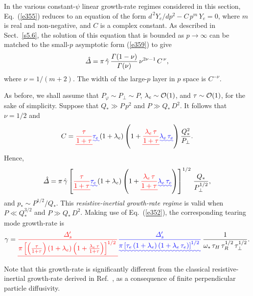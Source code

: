 \documentclass[12pt,prb,aps]{revtex4-1}
\providecommand{\DIFadd}[1]{{\protect\color{blue}\uwave{#1}}} %
\providecommand{\DIFdel}[1]{{\protect\color{red}\sout{#1}}}                      %
\providecommand{\DIFaddbegin}{} %
\providecommand{\DIFaddend}{} %
\providecommand{\DIFdelbegin}{} %
\providecommand{\DIFdelend}{} %
\begin{document}
In the various constant-$\psi$ linear growth-rate regimes considered in this section, Eq.~(\ref{e355}) reduces to an equation of the form
$d^{\,2} Y_e/dp^2 - C\,p^m\,Y_e = 0$,
where $m$ is real and non-negative, and $C$ is a complex constant. As described in Sect.~\ref{s5.6}, the solution of this
equation that is bounded as $p\rightarrow \infty$ can be matched to the small-$p$ asymptotic form (\ref{e359}) to give 
\begin{equation}
\hat{\mit\Delta} = \pi\,\hat{\gamma}\,\frac{{\mit\Gamma}(1-\nu)}{{\mit\Gamma}(\nu)}\,\nu^{2\nu-1}\,C^{\,\nu},
\end{equation}
where $\nu=1/(m+2)$. The width of the large-$p$ layer in $p$ space is $C^{-\nu}$. 

As before, we shall assume that $P_\varphi\sim P_\perp \sim P$, $\lambda_e\sim{\cal O}(1)$, and $\tau\sim {\cal O}(1)$, for
the sake of simplicity. 
Suppose that $Q_\ast\gg P\,p^2$ and $P\gg Q_\ast\,D^2$. It follows that $\nu=1/2$ and
\begin{equation}
C =\DIFdelbegin %
\DIFdel{\frac{\tau}{1+\tau}}%
\DIFdelend \DIFaddbegin \DIFadd{\tau_e\, }\DIFaddend (1+\lambda_e)\left(1+\DIFdelbegin \DIFdel{\frac{\lambda_e\,\tau}{1+\tau}}\DIFdelend \DIFaddbegin \DIFadd{\lambda_e\,\tau_e}\DIFaddend \right)\frac{Q_\ast^{2}}{P_\perp}.
\end{equation}
Hence, 
\begin{equation}
\hat{\mit\Delta} = \pi\,\hat{\gamma}\left[ \DIFdelbegin %
\DIFdel{\frac{\tau}{1+\tau}}%
\DIFdelend \DIFaddbegin \DIFadd{\tau_e\,}\DIFaddend (1+\lambda_e)\left(1+\DIFdelbegin \DIFdel{\frac{\lambda_e\,\tau}{1+\tau}}\DIFdelend \DIFaddbegin \DIFadd{\lambda_e\,\tau_e}\DIFaddend \right)\right]^{1/2}\,\frac{Q_\ast}{P_\perp^{1/2}},
\end{equation}
and $p_\ast\sim P^{1/2}/Q_\ast$. This {\em resistive-inertial  growth-rate regime}\/ is valid when $P\ll Q_\ast^{3/2}$ and
$P\gg Q_\ast\,D^2$. 
Making use of Eq.~(\ref{e352}), the corresponding tearing mode growth-rate is
\begin{equation}\label{e363}
\gamma = \DIFdelbegin \DIFdel{\frac{{\mit\Delta}_s'}{\pi\left[ \left(\frac{\tau}{1+\tau}\right)(1+\lambda_e)\left(1+\frac{\lambda_e\,\tau}{1+\tau}\right)\right]^{1/2}\,}}\DIFdelend \DIFaddbegin \DIFadd{\frac{{\mit\Delta}_s'}{\pi\left[ \tau_e\,(1+\lambda_e)\left(1+\lambda_e\,\tau_e\right)\right]^{1/2}\,}}\DIFaddend \,\frac{1}{\omega_\ast\,\tau_H\,\tau_R^{1/2}\,\tau_\perp^{1/2}}.
\end{equation}
Note that this growth-rate is significantly different from 
the classical resistive-inertial growth-rate derived in Ref.~,  as a consequence of finite perpendicular particle diffusivity. 
\end{document}
